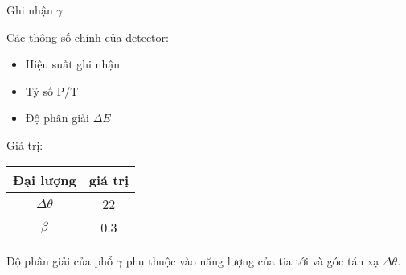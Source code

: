\begin{frame}[label = ghinhan]{Ghi nhận $\gamma$}

Các thông số chính của detector:

\begin{itemize}
	\pause\item Hiệu suất ghi nhận
	\pause\item Tỷ số P/T
	\pause \item Độ phân giải $\Delta E$
\end{itemize}

\pause
Giá trị: 

\begin{tabular}{cc}
	\pause Đại lượng & giá trị\\\hline
	\pause $\Delta\theta$ & 22\\
	\pause $\beta$ & 0.3
\end{tabular}

\pause
Độ phân giải của phổ $\gamma$ phụ thuộc vào năng lượng của tia tới và góc tán xạ $\Delta\theta$.

\end{frame}